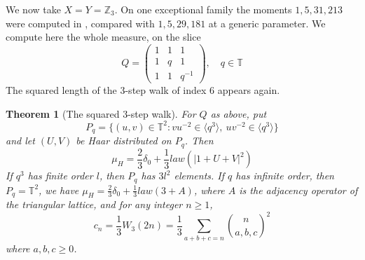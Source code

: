 \documentclass[11pt,reqno]{amsart}
\newtheorem{thm}{Theorem}[section]
\theoremstyle{definition}
\numberwithin{equation}{section}
\begin{document}
We now take $X=Y=\mathbb Z_3$. On one exceptional family the moments $1,5,31,213$ were computed in \cite[Section 4.3]{BO26}, compared with $1,5,29,181$ at a generic parameter. We compute here the whole measure, on the slice
$$Q
=\begin{pmatrix}1&1&1\\1&q&1\\1&1&q^{-1}\end{pmatrix},
\quad q\in\mathbb T$$
The squared length of the 3-step walk of index 6 appears again.

\begin{thm}[The squared 3-step walk]
For $Q$ as above, put
$$P_q
=\{(u,v)\in\mathbb T^2:vu^{-2}\in\langle q^3\rangle,\ uv^{-2}\in\langle q^3\rangle\}$$
and let $(U,V)$ be Haar distributed on $P_q$. Then
$$\mu_H=\frac23\delta_0+\frac13 law(|1+U+V|^2)$$
If $q^3$ has finite order $l$, then $P_q$ has $3l^2$ elements. If $q$ has infinite order, then $P_q=\mathbb T^2$, we have $\mu_H=\frac23\delta_0+\frac13 law(3+A)$, where $A$ is the adjacency operator of the triangular lattice, and for any integer $n\geq1$,
$$c_n=\frac13W_3(2n)=\frac13\sum_{a+b+c=n}\binom n{a,b,c}^2$$
where $a,b,c\geq0$.
\end{thm}
\end{document}
